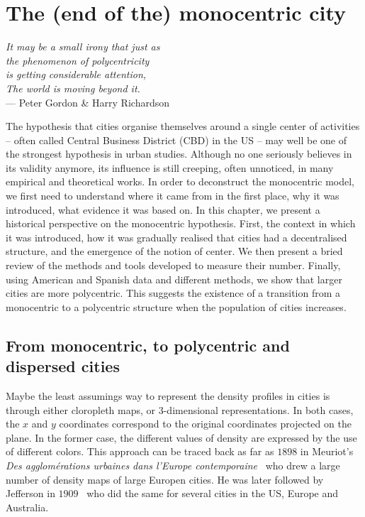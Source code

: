 %
\chapter{The (end of the) monocentric city}
\label{chap:monocentric_introduction}

\begin{flushright}{\slshape    
It may be a small irony that  
just as\\
the phenomenon of polycentricity\\ is getting considerable attention,\\
The world is moving beyond it.} \\ \medskip
--- Peter Gordon \& Harry Richardson~\cite{Gordon:1996}
\end{flushright}


\bigskip


The hypothesis that cities organise themselves around a single center of
activities -- often called Central Business District (CBD) in the US -- may well
be one of the strongest hypothesis in urban studies. Although no one seriously
believes in its validity anymore, its influence is still creeping, often
unnoticed, in many empirical and theoretical works.  In order to deconstruct the
monocentric model, we first need to understand where it came from in the first
place, why it was introduced, what evidence it was based on. In this chapter, we
present a historical perspective on the monocentric hypothesis. First, the
context in which it was introduced,  how it was gradually realised that cities
had a decentralised structure, and the emergence of the notion of center. We
then present a bried review of the methods and tools developed to measure their
number. Finally, using American and Spanish data and different methods, we show
that larger cities are more polycentric. This suggests the existence of a
transition from a monocentric to a polycentric structure when the population of
cities increases.

\section{From monocentric, to polycentric and dispersed cities}
\label{sec:introduction}

Maybe the least assumings way to represent the density profiles in cities is
through either cloropleth maps, or 3-dimensional representations. In both cases,
the $x$ and $y$ coordinates correspond to the original coordinates projected on
the plane. In the former case, the different values of density are expressed by
the use of different colors. This approach can be traced back as far as $1898$
in Meuriot's \emph{Des agglom\'erations urbaines dans l'Europe
contemporaine}~\cite{Meuriot:1898} who drew a large number of density maps of
large Europen cities. He was later followed by Jefferson in
$1909$~\cite{Jefferson:1909} who did the same for several cities in the US,
Europe and Australia.\\


